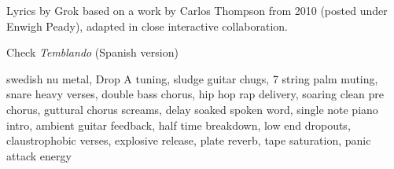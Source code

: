 
\label{sec:skalvning}
\begin{notes}
Lyrics by Grok based on a work by Carlos Thompson from 2010 (posted under Enwigh Peady), adapted in close interactive collaboration.

Check \emph{Temblando} (Spanish version)
\end{notes}
\begin{style}
swedish nu metal, Drop A tuning, sludge guitar chugs, 7 string palm muting, snare heavy verses, double bass chorus, hip hop rap delivery, soaring clean pre chorus, guttural chorus screams, delay soaked spoken word, single note piano intro, ambient guitar feedback, half time breakdown, low end dropouts, claustrophobic verses, explosive release, plate reverb, tape saturation, panic attack energy
\end{style}
